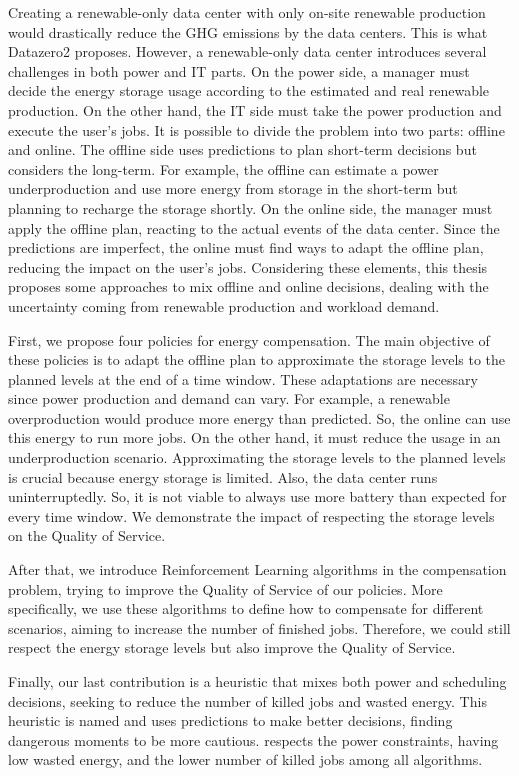 Creating a renewable-only data center with only on-site renewable production would drastically reduce the GHG emissions by the data centers. This is what Datazero2 proposes. However, a renewable-only data center introduces several challenges in both power and IT parts. On the power side, a manager must decide the energy storage usage according to the estimated and real renewable production. On the other hand, the IT side must take the power production and execute the user's jobs. It is possible to divide the problem into two parts: offline and online. The offline side uses predictions to plan short-term decisions but considers the long-term. For example, the offline can estimate a power underproduction and use more energy from storage in the short-term but planning to recharge the storage shortly. On the online side, the manager must apply the offline plan, reacting to the actual events of the data center. Since the predictions are imperfect, the online must find ways to adapt the offline plan, reducing the impact on the user's jobs. Considering these elements, this thesis proposes some approaches to mix offline and online decisions, dealing with the uncertainty coming from renewable production and workload demand.

First, we propose four policies for energy compensation. The main objective of these policies is to adapt the offline plan to approximate the storage levels to the planned levels at the end of a time window. These adaptations are necessary since power production and demand can vary. For example, a renewable overproduction would produce more energy than predicted. So, the online can use this energy to run more jobs. On the other hand, it must reduce the usage in an underproduction scenario. Approximating the storage levels to the planned levels is crucial because energy storage is limited. Also, the data center runs uninterruptedly. So, it is not viable to always use more battery than expected for every time window. We demonstrate the impact of respecting the storage levels on the Quality of Service. 

After that, we introduce Reinforcement Learning algorithms in the compensation problem, trying to improve the Quality of Service of our policies. More specifically, we use these algorithms to define how to compensate for different scenarios, aiming to increase the number of finished jobs. Therefore, we could still respect the energy storage levels but also improve the Quality of Service. 

Finally, our last contribution is a heuristic that mixes both power and scheduling decisions, seeking to reduce the number of killed jobs and wasted energy. This heuristic is named \emph{\systemName} and uses predictions to make better decisions, finding dangerous moments to be more cautious. \emph{\systemName} respects the power constraints, having low wasted energy, and the lower number of killed jobs among all algorithms.